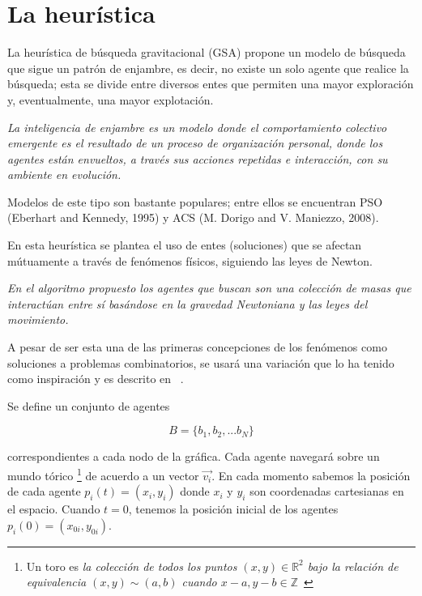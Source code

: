 \documentclass[a4paper]{report}
\begin{document}
\section{La heur\'istica}
La heur\'istica de b\'usqueda gravitacional (GSA) propone un modelo de b\'usqueda que
sigue un patr\'on de enjambre, es decir, no existe un solo agente que realice la
b\'usqueda; esta se divide entre diversos entes que permiten una mayor exploraci\'on
y, eventualmente, una mayor explotaci\'on.

\begin{center}
  \textit{La inteligencia de enjambre es un modelo donde el comportamiento colectivo
    emergente es el resultado de un proceso de organizaci\'on personal, donde los
    agentes est\'an envueltos, a trav\'es sus acciones repetidas e interacci\'on,
    con su ambiente en evoluci\'on. ~\cite{israel}}
\end{center}

Modelos de este tipo son bastante populares; entre ellos se encuentran PSO (Eberhart
and Kennedy, 1995) y ACS (M. Dorigo and V. Maniezzo, 2008).

En esta heur\'istica se plantea el uso de entes (soluciones) que
se afectan m\'utuamente a trav\'es de fen\'omenos f\'isicos, siguiendo las leyes
de Newton.

\begin{center}
  \textit{En el algoritmo propuesto los agentes que buscan son una colecci\'on de masas
    que interact\'uan entre s\'i bas\'andose en la gravedad Newtoniana y las leyes
    del movimiento. ~\cite{gsa}}
\end{center}

A pesar de ser esta una de las primeras concepciones de los fen\'omenos como soluciones
a problemas combinatorios, se usar\'a una variaci\'on que lo ha tenido como
inspiraci\'on y es descrito en ~\cite{israel}.

Se define un conjunto de agentes

\[B = \{b_1, b_2, ... b_N\}\]

correspondientes a cada nodo de la gr\'afica. Cada agente navegar\'a sobre un
mundo t\'orico \footnote{Un toro es \textit{la colecci\'on de todos los puntos
    $(x, y) \in \mathbb{R}^2$ bajo la relaci\'on de equivalencia $(x, y) \sim
    (a, b)$ cuando $x - a, y-b \in \mathbb{Z}$}~\cite{toroidal}} de acuerdo
a un vector $\vec{v_i}$. En cada momento sabemos la posici\'on de cada agente
$p_i(t) = (x_i, y_i)$ donde $x_i$ y $y_i$ son coordenadas cartesianas en el
espacio. Cuando $t = 0$, tenemos la posici\'on inicial de los agentes $p_i(0) = (x_{0i}, y_{0i})$.
\end{document}

